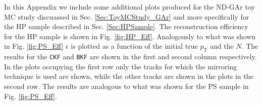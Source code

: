 In this Appendix we include some additional plots produced for the ND-GAr toy MC study discuassed in Sec. \ref{Sec:ToyMCStudy_GAr} and more specifically for the HP sample described in Sec. \ref{Sec:HPSample}. The reconstruction efficiency for the HP sample is shown in Fig. \ref{fig:HP_Eff}. Analogously to what was shown in Fig. \ref{fig:PS_Eff} $\epsilon$ is plotted as a function of the initial true $p_\textrm{T}$ and the $N$. The results for the \texttt{CKF} and \texttt{BKF} are shown in the first and second column respectively. In the plots occupying the first row only the tracks for which the mirroring technique is used are shown, while the other tracks are shown in the plots in the second row. The results are analogous to what was shown for the PS sample in Fig. \ref{fig:PS_Eff}.


\clearpage




